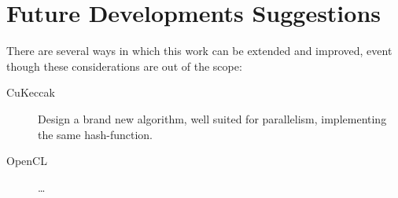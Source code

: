 \section{Future Developments Suggestions}
There are several ways in which this work can be extended and improved, event though these considerations are out of the scope:
\begin{description}
\item [CuKeccak] Design a brand new algorithm, well suited for parallelism, implementing the same hash-function.
\item [OpenCL] \dots
\end{description}
